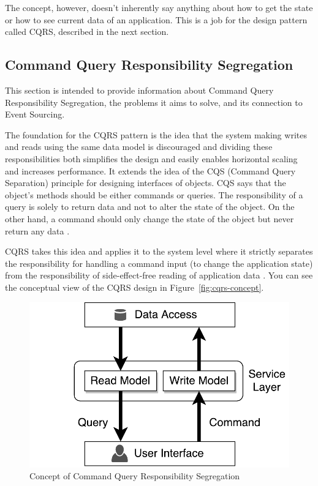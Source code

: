 \documentclass{book}
\begin{document}
The concept, however, doesn't inherently say anything about how to get
the state or how to see current data of an application. This is a job
for the design pattern called CQRS, described in the next section.


\subsection{Command Query Responsibility
Segregation}\label{command-query-responsibility-segregation}

This section is intended to provide information about Command Query
Responsibility Segregation, the problems it aims to solve, and its
connection to Event Sourcing.

The foundation for the CQRS pattern is the idea that the system making
writes and reads using the same data model is discouraged and dividing
these responsibilities both simplifies the design and easily enables
horizontal scaling and increases performance. It extends the idea of the
CQS (Command Query Separation) principle for designing interfaces of
objects. CQS says that the object's methods should be either commands or
queries. The responsibility of a query is solely to return data and not
to alter the state of the object. On the other hand, a command should
only change the state of the object but never return any data
\cite{journey}.

CQRS takes this idea and applies it to the system level where it
strictly separates the responsibility for handling a command input (to
change the application state) from the responsibility of
side-effect-free reading of application data \cite{journey}. You can see
the conceptual view of the CQRS design in Figure~\ref{fig:cqrs-concept}.


\begin{figure}[h!]
\begin{center}
\includegraphics[width=0.49\columnwidth]{figures/cqrs-concept/cqrs-concept}
\caption{Concept of Command Query Responsibility Segregation%
}
\end{center}
\end{figure}
\end{document}
